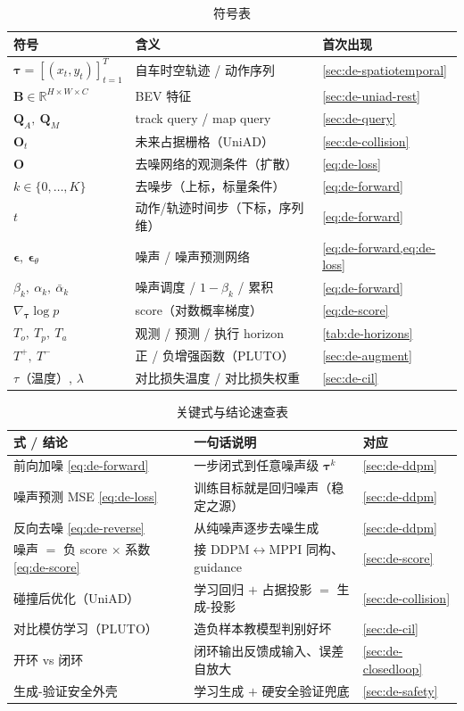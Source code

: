 \begin{table}[H]\centering\small
\caption{符号表}
\begin{tabular}{lll}
\toprule
符号 & 含义 & 首次出现 \\
\midrule
$\boldsymbol{\tau}=[(x_t,y_t)]_{t=1}^{T}$ & 自车时空轨迹 / 动作序列 & \cref{sec:de-spatiotemporal} \\
$\mathbf{B}\in\mathbb{R}^{H\times W\times C}$ & BEV 特征 & \cref{sec:de-uniad-rest} \\
$\mathbf{Q}_A,\ \mathbf{Q}_M$ & track query / map query & \cref{sec:de-query} \\
$\mathbf{O}_t$ & 未来占据栅格（UniAD）& \cref{sec:de-collision} \\
$\mathbf{O}$ & 去噪网络的观测条件（扩散）& \cref{eq:de-loss} \\
$k\in\{0,\dots,K\}$ & 去噪步（上标，标量条件） & \cref{eq:de-forward} \\
$t$ & 动作/轨迹时间步（下标，序列维） & \cref{eq:de-forward} \\
$\boldsymbol{\epsilon},\ \boldsymbol{\epsilon}_\theta$ & 噪声 / 噪声预测网络 & \cref{eq:de-forward,eq:de-loss} \\
$\beta_k,\ \alpha_k,\ \bar\alpha_k$ & 噪声调度 / $1-\beta_k$ / 累积 & \cref{eq:de-forward} \\
$\nabla_{\boldsymbol{\tau}}\log p$ & score（对数概率梯度） & \cref{eq:de-score} \\
$T_o,\ T_p,\ T_a$ & 观测 / 预测 / 执行 horizon & \cref{tab:de-horizons} \\
$T^+,\ T^-$ & 正 / 负增强函数（PLUTO）& \cref{sec:de-augment} \\
$\tau$（温度）, $\lambda$ & 对比损失温度 / 对比损失权重 & \cref{sec:de-cil} \\
\bottomrule
\end{tabular}
\end{table}

\begin{table}[H]\centering\small
\caption{关键式与结论速查表}
\begin{tabular}{lll}
\toprule
式 / 结论 & 一句话说明 & 对应 \\
\midrule
前向加噪 \cref{eq:de-forward} & 一步闭式到任意噪声级 $\boldsymbol{\tau}^k$ & \cref{sec:de-ddpm} \\
噪声预测 MSE \cref{eq:de-loss} & 训练目标就是回归噪声（稳定之源）& \cref{sec:de-ddpm} \\
反向去噪 \cref{eq:de-reverse} & 从纯噪声逐步去噪生成 & \cref{sec:de-ddpm} \\
噪声 $=$ 负 score $\times$ 系数 \cref{eq:de-score} & 接 DDPM$\leftrightarrow$MPPI 同构、guidance & \cref{sec:de-score} \\
碰撞后优化（UniAD）& 学习回归 $+$ 占据投影 $=$ 生成-投影 & \cref{sec:de-collision} \\
对比模仿学习（PLUTO）& 造负样本教模型判别好坏 & \cref{sec:de-cil} \\
开环 vs 闭环 & 闭环输出反馈成输入、误差自放大 & \cref{sec:de-closedloop} \\
生成-验证安全外壳 & 学习生成 $+$ 硬安全验证兜底 & \cref{sec:de-safety} \\
\bottomrule
\end{tabular}
\end{table}

